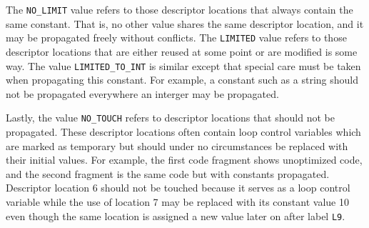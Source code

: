 The \texttt{NO\_LIMIT} value refers to those descriptor locations that
always contain the same constant. That is, no other value shares the
same descriptor location, and it may be propagated freely without
conflicts. The \texttt{LIMITED} value refers to those descriptor
locations that are either reused at some point or are modified is some
way. The value \texttt{LIMITED\_TO\_INT} is similar except that
special care must be taken when propagating this constant. For
example, a constant such as a string should not be propagated
everywhere an interger may be propagated.

Lastly, the value \texttt{NO\_TOUCH} refers to descriptor locations
that should not be propagated. These descriptor locations often
contain loop control variables which are marked as temporary but
should under no circumstances be replaced with their initial
values. For example, the first code fragment shows unoptimized code,
and the second fragment is the same code but with constants
propagated. Descriptor location 6 should not be touched because it
serves as a loop control variable while the use of location 7 may be
replaced with its constant value 10 even though the same location is
assigned a new value later on after label \texttt{L9}.



